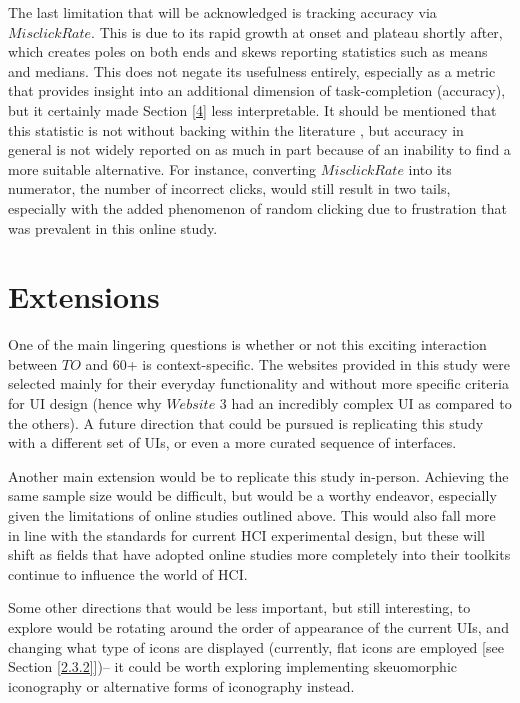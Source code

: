 \documentclass[12pt,twoside]{reedthesis}
\begin{document}
    The last limitation that will be acknowledged is tracking accuracy via $Misclick Rate$. This is due to its rapid growth at onset and plateau shortly after, which creates poles on both ends and skews reporting statistics such as means and medians. This does not negate its usefulness entirely, especially as a metric that provides insight into an additional dimension of task-completion (accuracy), but it certainly made Section \ref{4} less interpretable. It should be mentioned that this statistic is not without backing within the literature \cite{yu_reducing_2024}, but accuracy in general is not widely reported on as much in part because of an inability to find a more suitable alternative. For instance, converting $Misclick Rate$ into its numerator, the number of incorrect clicks, would still result in two tails, especially with the added phenomenon of random clicking due to frustration that was prevalent in this online study.

\section{Extensions}\label{5.3}
    One of the main lingering questions is whether or not this exciting interaction between $TO$ and 60+ is context-specific. The websites provided in this study were selected mainly for their everyday functionality and without more specific criteria for UI design (hence why $Website$ 3 had an incredibly complex UI as compared to the others). A future direction that could be pursued is replicating this study with a different set of UIs, or even a more curated sequence of interfaces. 

    Another main extension would be to replicate this study in-person. Achieving the same sample size would be difficult, but would be a worthy endeavor, especially given the limitations of online studies outlined above. This would also fall more in line with the standards for current HCI experimental design, but these will shift as fields that have adopted online studies more completely into their toolkits continue to influence the world of HCI.

    Some other directions that would be less important, but still interesting, to explore would be rotating around the order of appearance of the current UIs, and changing what type of icons are displayed (currently, flat icons are employed [see Section \ref{2.3.2}])-- it could be worth exploring implementing skeuomorphic iconography or alternative forms of iconography instead.
\end{document}
